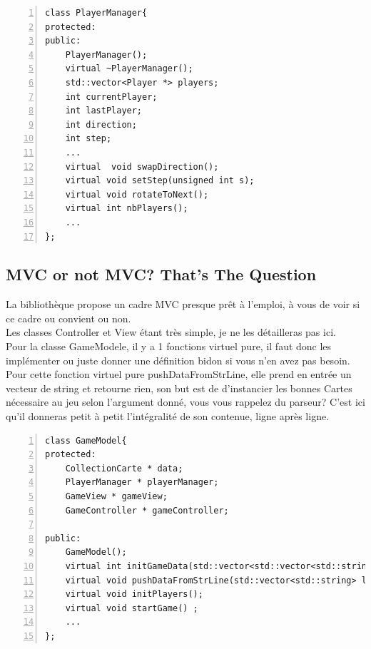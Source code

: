 \documentclass[12pt, letterpaper]{article}
\begin{document}
\begin{Verbatim}[numbers=left,xleftmargin = 5mm]
class PlayerManager{
protected:
public:
    PlayerManager();
    virtual ~PlayerManager();
    std::vector<Player *> players;
    int currentPlayer;
    int lastPlayer;
    int direction;
    int step;
    ...
    virtual  void swapDirection();
    virtual void setStep(unsigned int s);
    virtual void rotateToNext();
    virtual int nbPlayers();
    ...    
};

\end{Verbatim} 


\subsection{MVC or not MVC? That's The Question}

La bibliothèque propose un cadre MVC presque prêt à l'emploi, à vous de voir si ce cadre ou convient ou non.\\
Les classes Controller et View étant très simple, je ne les détailleras pas ici.\\
Pour la classe GameModele, il y a 1 fonctions virtuel pure, il faut donc les implémenter ou juste donner une définition bidon si vous n'en avez pas besoin.\\
Pour cette fonction virtuel pure pushDataFromStrLine, elle prend en entrée un vecteur de string et retourne rien,
son but est de d'instancier les bonnes Cartes nécessaire au jeu selon l'argument donné, vous vous rappelez du parseur? 
C'est ici qu'il donneras petit à petit l'intégralité de son contenue, ligne après ligne.\\

\begin{Verbatim}[numbers=left,xleftmargin = 5mm]
class GameModel{
protected:
    CollectionCarte * data;
    PlayerManager * playerManager;
    GameView * gameView;
    GameController * gameController;
    
public:
    GameModel();
    virtual int initGameData(std::vector<std::vector<std::string>> configData);
    virtual void pushDataFromStrLine(std::vector<std::string> line) = 0;
    virtual void initPlayers();
    virtual void startGame() ;
    ...
};
\end{Verbatim} 
\end{document}
